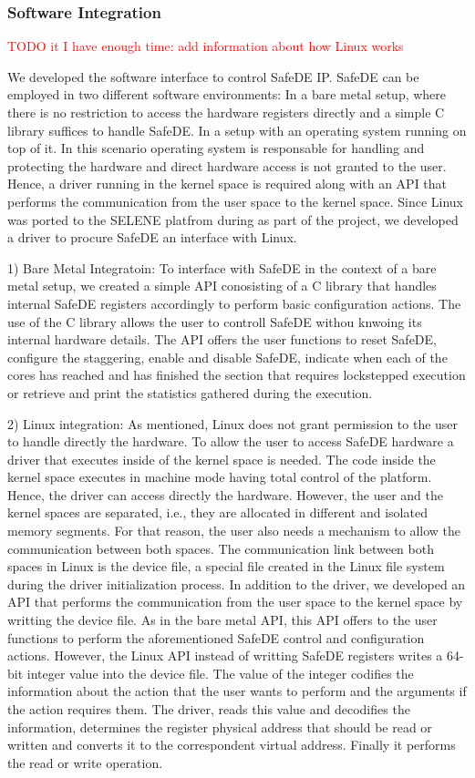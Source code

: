 \subsubsection{Software Integration}
\label{section:software_integration}
\textcolor{red}{TODO it I have enough time: add information about how Linux works}


We developed the software interface to control SafeDE IP. SafeDE can be employed in two different software environments: In a bare metal setup, where there is no restriction to access the hardware registers directly and a simple C library suffices to handle SafeDE. In a setup with an operating system running on top of it. In this scenario operating system is responsable for handling and protecting the hardware and direct hardware access is not granted to the user. Hence, a driver running in the kernel space is required along with an API that performs the communication from the user space to the kernel space. Since Linux was ported to the SELENE platfrom during as part of the project, we developed a driver to procure SafeDE an interface with Linux.

1) Bare Metal Integratoin: To interface with SafeDE in the context of a bare metal setup, we created a simple API conosisting of a C library that handles internal SafeDE registers accordingly to perform basic configuration actions. The use of the C library allows the user to controll SafeDE withou knwoing its internal hardware details. The API offers the user functions to reset SafeDE, configure the staggering, enable and disable SafeDE, indicate when each of the cores has reached and has finished the section that requires lockstepped execution or retrieve and print the statistics gathered during the execution. 

2) Linux integration: As mentioned, Linux does not grant permission to the user to handle directly the hardware. To allow the user to access SafeDE hardware a driver that executes inside of the kernel space is needed. The code inside the kernel space executes in machine mode having total control of the platform. Hence, the driver can access directly the hardware. However, the user and the kernel spaces are separated, i.e., they are allocated in different and isolated memory segments. For that reason, the user also needs a mechanism to allow the communication between both spaces. The communication link between both spaces in Linux is the device file, a special file created in the Linux file system during the driver initialization process. In addition to the driver, we developed an API that performs the communication from the user space to the kernel space by writting the device file. As in the bare metal API, this API offers to the user functions to perform the aforementioned SafeDE control and configuration actions. However, the Linux API instead of writting SafeDE registers writes a 64-bit integer value into the device file. The value of the integer codifies the information about the action that the user wants to perform and the arguments if the action requires them. The driver, reads this value and decodifies the information, determines the register physical address that should be read or written and converts it to the correspondent virtual address. Finally it performs the read or write operation.

